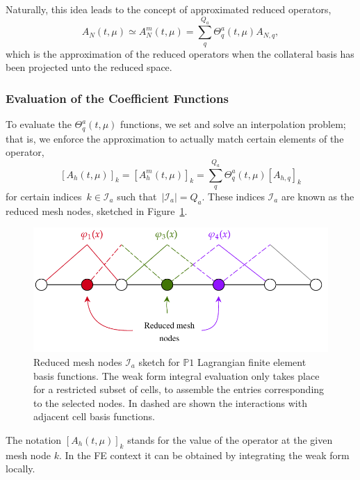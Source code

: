 \documentclass[../../thesis.tex]{subfiles}
\begin{document}
Naturally, this idea leads to the concept of approximated reduced operators,
\begin{equation}
    A_N(t, \mu) \simeq A_N^m(t, \mu) = \sum_q^{Q_a} \Theta_q^a(t, \mu) A_{N,q},
\end{equation}
which is the approximation of the reduced operators when the collateral basis 
has been projected unto the reduced space.

\subsubsection{Evaluation of the Coefficient Functions}
To evaluate the $\Theta_q^a(t, \mu)$ functions, we set and solve an interpolation problem;
that is, 
we enforce the approximation to actually match certain elements of the operator, 
\begin{equation}
    \label{eq:1d_rom_burgers_interpolation_problem}
    [A_h(t, \mu)]_{k} = [A_h^m(t, \mu)]_{k} = \sum_q^{Q_a} \Theta_q^a(t, \mu) [A_{h, q}]_{k}
\end{equation}
for certain indices~$k \in \mathcal{I}_a$ such that~$\left|\mathcal{I}_a\right| = Q_a$.
These indices $\mathcal{I}_a$ are known as the reduced mesh nodes, 
sketched in Figure~\ref{fig:reduced_mesh}.
\begin{figure}[h]
    \includegraphics[width=0.99\columnwidth]{research_project/piston/figures/reduced_mesh_nodes.pdf}
    \caption{Reduced mesh nodes $\mathcal{I}_a$ sketch 
    for $\mathbb{P}1$ Lagrangian finite element basis functions. 
    The weak form integral evaluation only takes place for a restricted subset of cells,
    to assemble the entries corresponding to the selected nodes.  
    In dashed are shown the interactions with adjacent cell basis functions.}
    \label{fig:reduced_mesh}
\end{figure}
The notation $[A_h(t, \mu)]_{k}$ stands for the value of the operator at the given mesh node $k$.
In the FE context it can be obtained by integrating the weak form locally.
\end{document}
